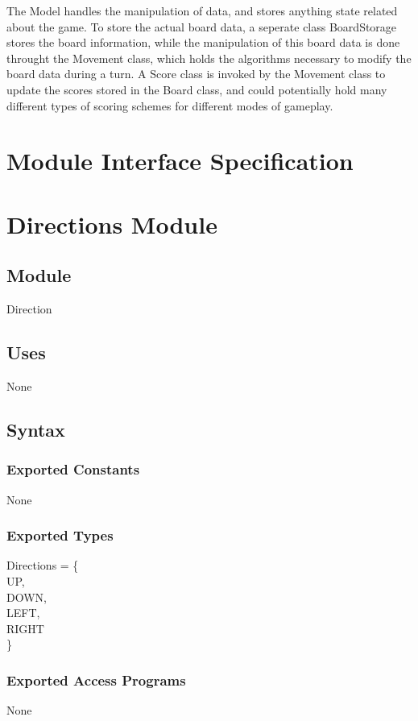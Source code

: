 \documentclass{article}
\begin{document}
		The Model handles the manipulation of data, and stores anything state related about the game. To store the actual board data, a seperate class BoardStorage stores the board information, while the manipulation of this board data is done throught the Movement class, which holds the algorithms necessary to modify the board data during a turn. A Score class is invoked by the Movement class to update the scores stored in the Board class, and could potentially hold many different types of scoring schemes for different modes of gameplay.

\newpage

\section{Module Interface Specification}

\section*{Directions Module}

	\subsection*{Module}
		Direction

	\subsection*{Uses}
		None

	\subsection*{Syntax}

		\subsubsection*{Exported Constants}
			None

		\subsubsection*{Exported Types}
			Directions = \{\\
				UP,\\
				DOWN,\\
				LEFT,\\
				RIGHT\\
			\}

		\subsubsection*{Exported Access Programs}
			None
\end{document}
